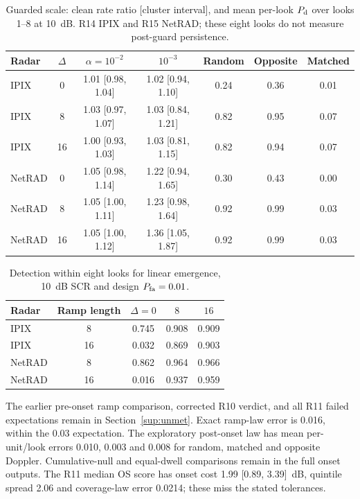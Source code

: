 \documentclass[10pt]{article}
\begin{document}
\begin{table}[htbp]
\centering\small\setlength{\tabcolsep}{4pt}
\caption{Guarded scale: clean rate ratio [cluster interval], and mean per-look $P_{\rm d}$ over looks 1--8 at 10~dB. R14 IPIX and R15 NetRAD; these eight looks do not measure post-guard persistence.}\label{tab:guards}
\begin{tabular}{lcccccc}
\toprule
Radar & $\Delta$ & $\alpha=10^{-2}$ & $10^{-3}$ & Random & Opposite & Matched \\
\midrule
IPIX & 0 & 1.01 [0.98, 1.04] & 1.02 [0.94, 1.10] & 0.24 & 0.36 & 0.01 \\
IPIX & 8 & 1.03 [0.97, 1.07] & 1.03 [0.84, 1.21] & 0.82 & 0.95 & 0.07 \\
IPIX & 16 & 1.00 [0.93, 1.03] & 1.03 [0.81, 1.15] & 0.82 & 0.94 & 0.07 \\
NetRAD & 0 & 1.05 [0.98, 1.14] & 1.22 [0.94, 1.65] & 0.30 & 0.43 & 0.00 \\
NetRAD & 8 & 1.05 [1.00, 1.11] & 1.23 [0.98, 1.64] & 0.92 & 0.99 & 0.03 \\
NetRAD & 16 & 1.05 [1.00, 1.12] & 1.36 [1.05, 1.87] & 0.92 & 0.99 & 0.03 \\
\bottomrule
\end{tabular}
\end{table}


\begin{table}[htbp]
\centering\small\setlength{\tabcolsep}{4pt}
\caption{Detection within eight looks for linear emergence, 10~dB SCR and design $P_{\rm fa}=0.01$.}\label{tab:ramps}
\begin{tabular}{lcccc}
\toprule
Radar & Ramp length & $\Delta=0$ & $8$ & $16$ \\
\midrule
IPIX & 8 & 0.745 & 0.908 & 0.909 \\
IPIX & 16 & 0.032 & 0.869 & 0.903 \\
NetRAD & 8 & 0.862 & 0.964 & 0.966 \\
NetRAD & 16 & 0.016 & 0.937 & 0.959 \\
\bottomrule
\end{tabular}
\end{table}

The earlier pre-onset ramp comparison, corrected R10 verdict, and all R11 failed expectations remain in Section~\ref{sup:unmet}. Exact ramp-law error is 0.016, within the 0.03 expectation. The exploratory post-onset law has mean per-unit/look errors 0.010, 0.003 and 0.008 for random, matched and opposite Doppler. Cumulative-null and equal-dwell comparisons remain in the full onset outputs. The R11 median OS score has onset cost 1.99 [0.89, 3.39]~dB, quintile spread 2.06 and coverage-law error 0.0214; these miss the stated tolerances.
\end{document}
